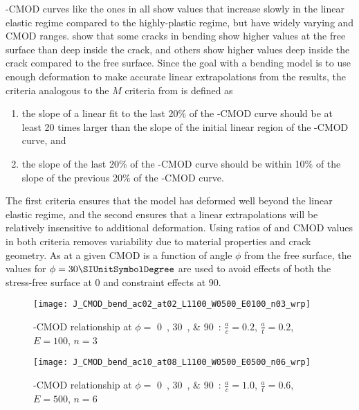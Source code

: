 \J{}-CMOD curves like the ones in  all show \J values that increase slowly in the linear elastic regime compared to the highly-plastic regime, but have widely varying \J and CMOD ranges.  show that some cracks in bending show higher \J values at the free surface than deep inside the crack, and others show higher \J values deep inside the crack compared to the free surface.
Since the goal with a bending model is to use enough deformation to make accurate linear extrapolations from the results, the criteria analogous to the \(M\) criteria from \cite{allenwells2014} is defined as
\begin{enumerate} \label{list:criteria}
\item the slope of a linear fit to the last 20\% of the \J-CMOD curve should be at least 20 times larger than the slope of the initial linear region of the \J-CMOD curve, and
\item the slope of the last 20\% of the \J-CMOD curve should be within 10\% of the slope of the previous 20\% of the \J-CMOD curve.
\end{enumerate}
The first criteria ensures that the model has deformed well beyond the linear elastic regime, and the second ensures that a linear extrapolations will be relatively insensitive to additional deformation.
Using ratios of \J and CMOD values in both criteria removes variability due to material properties and crack geometry.
As \J at a given CMOD is a function of angle \(\phi\) from the free surface, the \J values for \(\phi=30{\SIUnitSymbolDegree}\) are used to avoid effects of both the stress-free surface at \SI{0}{\SIUnitSymbolDegree} and constraint effects at \SI{90}{\SIUnitSymbolDegree}.

\begin{figure}[tbp]
\centering
\texttt{[image: J\_CMOD\_bend\_ac02\_at02\_L1100\_W0500\_E0100\_n03\_wrp]}
\caption{\J-CMOD relationship at \(\phi=\) \SIlist{0;30;90}{\SIUnitSymbolDegree}: \(\frac{a}{c}=0.2\), \(\frac{a}{t}=0.2\), \(E=100\), \(n=3\) \label{fig:J-phi-ac_02_at_02_E0100_n03}}
\end{figure}
\begin{figure}[tbp]
\centering
\texttt{[image: J\_CMOD\_bend\_ac10\_at08\_L1100\_W0500\_E0500\_n06\_wrp]}
\caption{\J-CMOD relationship at \(\phi=\) \SIlist{0;30;90}{\SIUnitSymbolDegree}: \(\frac{a}{c}=1.0\), \(\frac{a}{t}=0.6\), \(E=500\), \(n=6\) \label{fig:J-phi-ac_10_at_08_E0500_n06}}
\end{figure}

